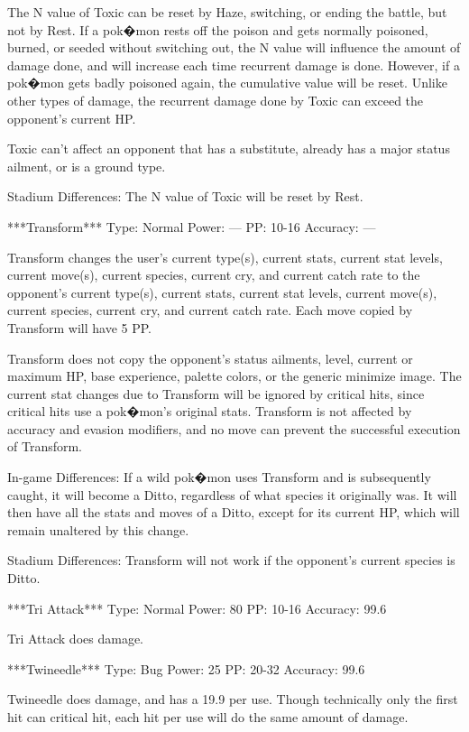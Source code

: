 \documentclass[reprint, aps, prl, paper=A4]{revtex4-1}
\begin{document}
The N value of Toxic can be reset by Haze, switching, or ending the battle, but not by Rest. If
a pok�mon rests off the poison and gets normally poisoned, burned, or seeded without switching
out, the N value will influence the amount of damage done, and will increase each time
recurrent damage is done. However, if a pok�mon gets badly poisoned again, the cumulative value
will be reset. Unlike other types of damage, the recurrent damage done by Toxic can exceed the
opponent's current HP.

Toxic can't affect an opponent that has a substitute, already has a major status ailment, or is
a ground type.

Stadium Differences:
The N value of Toxic will be reset by Rest.


***Transform***
Type: Normal
Power: ---
PP: 10-16
Accuracy: ---

Transform changes the user's current type(s), current stats, current stat levels, current
move(s), current species, current cry, and current catch rate to the opponent's current
type(s), current stats, current stat levels, current move(s), current species, current cry, and
current catch rate. Each move copied by Transform will have 5 PP.

Transform does not copy the opponent's status ailments, level, current or maximum HP, base
experience, palette colors, or the generic minimize image. The current stat changes due to
Transform will be ignored by critical hits, since critical hits use a pok�mon's original stats.
Transform is not affected by accuracy and evasion modifiers, and no move can prevent the
successful execution of Transform.

In-game Differences:
If a wild pok�mon uses Transform and is subsequently caught, it will become a Ditto, regardless
of what species it originally was. It will then have all the stats and moves of a Ditto, except
for its current HP, which will remain unaltered by this change.

Stadium Differences:
Transform will not work if the opponent's current species is Ditto.


***Tri Attack***
Type: Normal
Power: 80
PP: 10-16
Accuracy: 99.6%

Tri Attack does damage.


***Twineedle***
Type: Bug
Power: 25
PP: 20-32
Accuracy: 99.6%

Twineedle does damage, and has a 19.9%
per use. Though technically only the first hit can critical hit, each hit per use will do the
same amount of damage.
\end{document}
